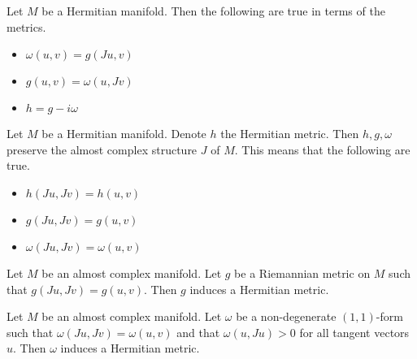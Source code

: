 \documentclass[a4paper]{article}
\begin{document}
\begin{prp}{}{} Let $M$ be a Hermitian manifold. Then the following are true in terms of the metrics. 
\begin{itemize}
\item $\omega(u,v)=g(Ju,v)$
\item $g(u,v)=\omega(u,Jv)$
\item $h=g-i\omega$
\end{itemize}
\end{prp}

\begin{thm}{}{} Let $M$ be a Hermitian manifold. Denote $h$ the Hermitian metric. Then $h,g,\omega$ preserve the almost complex structure $J$ of $M$. This means that the following are true. 
\begin{itemize}
\item $h(Ju,Jv)=h(u,v)$
\item $g(Ju,Jv)=g(u,v)$
\item $\omega(Ju,Jv)=\omega(u,v)$
\end{itemize}
\end{thm}

\begin{lmm}{}{} Let $M$ be an almost complex manifold. Let $g$ be a Riemannian metric on $M$ such that $g(Ju,Jv)=g(u,v)$. Then $g$ induces a Hermitian metric. 
\end{lmm}

\begin{lmm}{}{} Let $M$ be an almost complex manifold. Let $\omega$ be a non-degenerate $(1,1)$-form such that $\omega(Ju,Jv)=\omega(u,v)$ and that $\omega(u,Ju)>0$ for all tangent vectors $u$. Then $\omega$ induces a Hermitian metric. 
\end{lmm}
\end{document}
